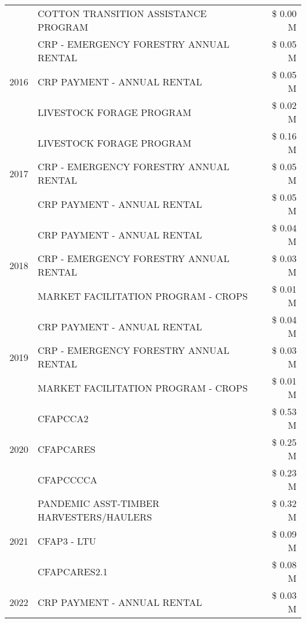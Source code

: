 \begin{tabular}{llr}
 & COTTON TRANSITION ASSISTANCE PROGRAM & \$ 0.00 M \\
\cline{1-3}
\multirow[t]{3}{*}{2016} & CRP - EMERGENCY FORESTRY ANNUAL RENTAL & \$ 0.05 M \\
 & CRP PAYMENT - ANNUAL RENTAL & \$ 0.05 M \\
 & LIVESTOCK FORAGE PROGRAM & \$ 0.02 M \\
\cline{1-3}
\multirow[t]{3}{*}{2017} & LIVESTOCK FORAGE PROGRAM & \$ 0.16 M \\
 & CRP - EMERGENCY FORESTRY ANNUAL RENTAL & \$ 0.05 M \\
 & CRP PAYMENT - ANNUAL RENTAL & \$ 0.05 M \\
\cline{1-3}
\multirow[t]{3}{*}{2018} & CRP PAYMENT - ANNUAL RENTAL & \$ 0.04 M \\
 & CRP - EMERGENCY FORESTRY ANNUAL RENTAL & \$ 0.03 M \\
 & MARKET FACILITATION PROGRAM - CROPS & \$ 0.01 M \\
\cline{1-3}
\multirow[t]{3}{*}{2019} & CRP PAYMENT - ANNUAL RENTAL & \$ 0.04 M \\
 & CRP - EMERGENCY FORESTRY ANNUAL RENTAL & \$ 0.03 M \\
 & MARKET FACILITATION PROGRAM - CROPS & \$ 0.01 M \\
\cline{1-3}
\multirow[t]{3}{*}{2020} & CFAPCCA2 & \$ 0.53 M \\
 & CFAPCARES & \$ 0.25 M \\
 & CFAPCCCCA & \$ 0.23 M \\
\cline{1-3}
\multirow[t]{3}{*}{2021} & PANDEMIC ASST-TIMBER HARVESTERS/HAULERS & \$ 0.32 M \\
 & CFAP3 - LTU & \$ 0.09 M \\
 & CFAPCARES2.1 & \$ 0.08 M \\
\cline{1-3}
2022 & CRP PAYMENT - ANNUAL RENTAL & \$ 0.03 M \\
\cline{1-3}
\bottomrule
\end{tabular}
